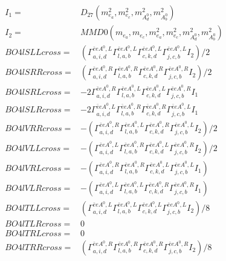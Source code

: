 \documentclass[A4,landscape]{article}
\begin{document}
\begin{align} 
I_1 = & D_{27}(m^2_{e_{{a}}}, m^2_{e_{{c}}}, m^2_{A^0_{{d}}}, m^2_{A^0_{{b}}}) \\ 
I_2 = & MMD0(m_{e_{{a}}}, m_{e_{{c}}}, m^2_{e_{{a}}}, m^2_{e_{{c}}}, m^2_{A^0_{{d}}}, m^2_{A^0_{{b}}}) \\ 
  BO4lSLLcross= & ( \Gamma^{\bar{e}e A^0 ,L}_{a, i, d} \Gamma^{\bar{e}e A^0 ,L}_{l, a, b} \Gamma^{\bar{e}e A^0 ,L}_{c, k, d} \Gamma^{\bar{e}e A^0 ,L}_{j, c, b} I_2)/2 \\ 
  BO4lSRRcross= & ( \Gamma^{\bar{e}e A^0 ,R}_{a, i, d} \Gamma^{\bar{e}e A^0 ,R}_{l, a, b} \Gamma^{\bar{e}e A^0 ,R}_{c, k, d} \Gamma^{\bar{e}e A^0 ,R}_{j, c, b} I_2)/2 \\ 
  BO4lSRLcross= & -2  \Gamma^{\bar{e}e A^0 ,R}_{a, i, d} \Gamma^{\bar{e}e A^0 ,L}_{l, a, b} \Gamma^{\bar{e}e A^0 ,L}_{c, k, d} \Gamma^{\bar{e}e A^0 ,R}_{j, c, b} I_1 \\ 
  BO4lSLRcross= & -2  \Gamma^{\bar{e}e A^0 ,L}_{a, i, d} \Gamma^{\bar{e}e A^0 ,R}_{l, a, b} \Gamma^{\bar{e}e A^0 ,R}_{c, k, d} \Gamma^{\bar{e}e A^0 ,L}_{j, c, b} I_1 \\ 
  BO4lVRRcross= & -( \Gamma^{\bar{e}e A^0 ,R}_{a, i, d} \Gamma^{\bar{e}e A^0 ,L}_{l, a, b} \Gamma^{\bar{e}e A^0 ,R}_{c, k, d} \Gamma^{\bar{e}e A^0 ,L}_{j, c, b} I_2)/2 \\ 
  BO4lVLLcross= & -( \Gamma^{\bar{e}e A^0 ,L}_{a, i, d} \Gamma^{\bar{e}e A^0 ,R}_{l, a, b} \Gamma^{\bar{e}e A^0 ,L}_{c, k, d} \Gamma^{\bar{e}e A^0 ,R}_{j, c, b} I_2)/2 \\ 
  BO4lVRLcross= & -( \Gamma^{\bar{e}e A^0 ,R}_{a, i, d} \Gamma^{\bar{e}e A^0 ,R}_{l, a, b} \Gamma^{\bar{e}e A^0 ,L}_{c, k, d} \Gamma^{\bar{e}e A^0 ,L}_{j, c, b} I_1) \\ 
  BO4lVLRcross= & -( \Gamma^{\bar{e}e A^0 ,L}_{a, i, d} \Gamma^{\bar{e}e A^0 ,L}_{l, a, b} \Gamma^{\bar{e}e A^0 ,R}_{c, k, d} \Gamma^{\bar{e}e A^0 ,R}_{j, c, b} I_1) \\ 
  BO4lTLLcross= & ( \Gamma^{\bar{e}e A^0 ,L}_{a, i, d} \Gamma^{\bar{e}e A^0 ,L}_{l, a, b} \Gamma^{\bar{e}e A^0 ,L}_{c, k, d} \Gamma^{\bar{e}e A^0 ,L}_{j, c, b} I_2)/8 \\ 
  BO4lTLRcross= & 0 \\ 
  BO4lTRLcross= & 0 \\ 
  BO4lTRRcross= & ( \Gamma^{\bar{e}e A^0 ,R}_{a, i, d} \Gamma^{\bar{e}e A^0 ,R}_{l, a, b} \Gamma^{\bar{e}e A^0 ,R}_{c, k, d} \Gamma^{\bar{e}e A^0 ,R}_{j, c, b} I_2)/8 \\ 
\end{align} 
\end{document}
